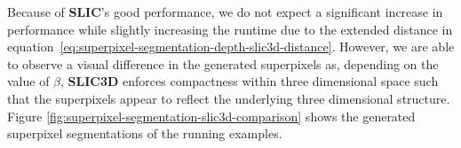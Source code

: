 Because of \textbf{SLIC}'s good performance, we do not expect a significant increase in performance while slightly increasing the runtime due to the extended distance in equation~\eqref{eq:superpixel-segmentation-depth-slic3d-distance}. However, we are able to observe a visual difference in the generated superpixels as, depending on the value of $\beta$, \textbf{SLIC3D} enforces compactness within three dimensional space such that the superpixels appear to reflect the underlying three dimensional structure. Figure \ref{fig:superpixel-segmentation-slic3d-comparison} shows the generated superpixel segmentations of the running examples.
\begin{figure}[t]
	\centering
\end{figure}

